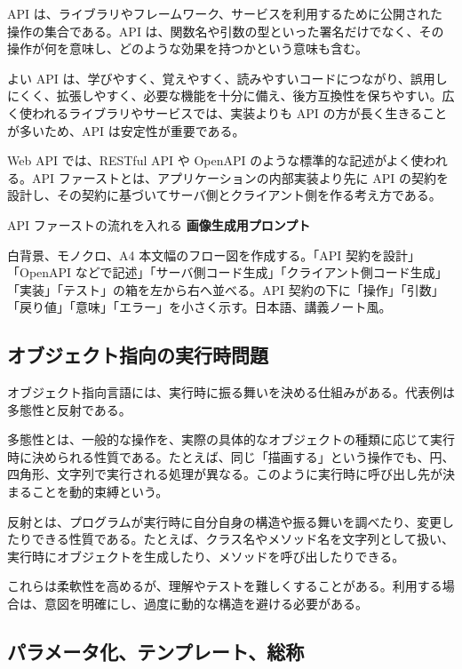 \documentclass[a4paper,11pt,ja=standard,xelatex]{bxjsarticle}
\begin{document}
API は、ライブラリやフレームワーク、サービスを利用するために公開された操作の集合である。API は、関数名や引数の型といった署名だけでなく、その操作が何を意味し、どのような効果を持つかという意味も含む。

よい API は、学びやすく、覚えやすく、読みやすいコードにつながり、誤用しにくく、拡張しやすく、必要な機能を十分に備え、後方互換性を保ちやすい。広く使われるライブラリやサービスでは、実装よりも API の方が長く生きることが多いため、API は安定性が重要である。

Web API では、RESTful API や OpenAPI のような標準的な記述がよく使われる。API ファーストとは、アプリケーションの内部実装より先に API の契約を設計し、その契約に基づいてサーバ側とクライアント側を作る考え方である。

\begin{todobox}{API ファーストの流れを入れる}
\textbf{画像生成用プロンプト}

白背景、モノクロ、A4 本文幅のフロー図を作成する。「API 契約を設計」「OpenAPI などで記述」「サーバ側コード生成」「クライアント側コード生成」「実装」「テスト」の箱を左から右へ並べる。API 契約の下に「操作」「引数」「戻り値」「意味」「エラー」を小さく示す。日本語、講義ノート風。
\end{todobox}

\subsection{オブジェクト指向の実行時問題}

オブジェクト指向言語には、実行時に振る舞いを決める仕組みがある。代表例は多態性と反射である。

多態性とは、一般的な操作を、実際の具体的なオブジェクトの種類に応じて実行時に決められる性質である。たとえば、同じ「描画する」という操作でも、円、四角形、文字列で実行される処理が異なる。このように実行時に呼び出し先が決まることを動的束縛という。

反射とは、プログラムが実行時に自分自身の構造や振る舞いを調べたり、変更したりできる性質である。たとえば、クラス名やメソッド名を文字列として扱い、実行時にオブジェクトを生成したり、メソッドを呼び出したりできる。

これらは柔軟性を高めるが、理解やテストを難しくすることがある。利用する場合は、意図を明確にし、過度に動的な構造を避ける必要がある。

\subsection{パラメータ化、テンプレート、総称}
\end{document}
